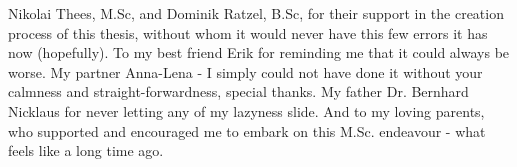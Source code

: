 \documentclass[a4paper, 12pt]{article}
\makeatletter
\renewcommand\lstlistoflistings{
  \section{\lstlistlistingname}
  \@starttoc{lol}%
}
\makeatother
\begin{document}
Nikolai Thees, M.Sc, and Dominik Ratzel, B.Sc, for their support in the creation process of this thesis, without whom it would never have this few errors it has now (hopefully).
To my best friend Erik for reminding me that it could always be worse.
My partner Anna-Lena - I simply could not have done it without your calmness and straight-forwardness, special thanks.
My father Dr. Bernhard Nicklaus for never letting any of my lazyness slide.
And to my loving parents, who supported and encouraged me to embark on this M.Sc. endeavour - what feels like a long time ago.

\lstlistoflistings

\pagebreak




\end{document}
